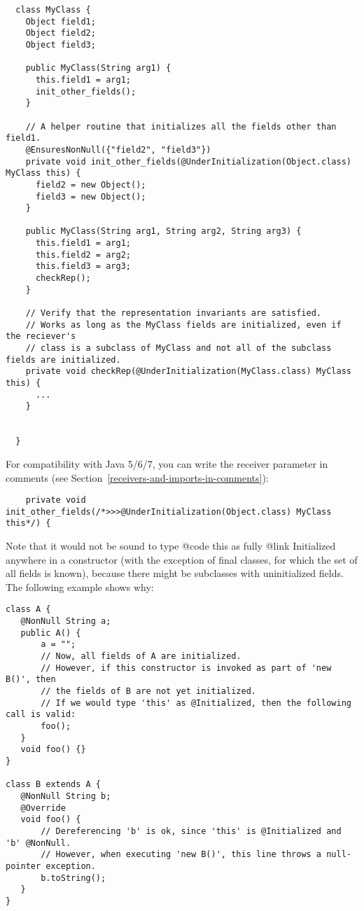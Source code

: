 \begin{Verbatim}
  class MyClass {
    Object field1;
    Object field2;
    Object field3;

    public MyClass(String arg1) {
      this.field1 = arg1;
      init_other_fields();
    }

    // A helper routine that initializes all the fields other than field1.
    @EnsuresNonNull({"field2", "field3"})
    private void init_other_fields(@UnderInitialization(Object.class) MyClass this) {
      field2 = new Object();
      field3 = new Object();
    }

    public MyClass(String arg1, String arg2, String arg3) {
      this.field1 = arg1;
      this.field2 = arg2;
      this.field3 = arg3;
      checkRep();
    }

    // Verify that the representation invariants are satisfied.
    // Works as long as the MyClass fields are initialized, even if the reciever's
    // class is a subclass of MyClass and not all of the subclass fields are initialized.
    private void checkRep(@UnderInitialization(MyClass.class) MyClass this) {
      ...
    }


  }
\end{Verbatim}

For compatibility with Java 5/6/7, you can write the receiver
parameter in comments (see Section~\ref{receivers-and-imports-in-comments}):
\begin{Verbatim}
    private void init_other_fields(/*>>>@UnderInitialization(Object.class) MyClass this*/) {
\end{Verbatim}


Note that it would not be sound to type {@code this} as fully {@link Initialized} anywhere in
a constructor (with the exception of final classes, for which the set
of all fields is known),
because there might be subclasses with uninitialized fields. The following example shows why:

\begin{Verbatim}
class A {
   @NonNull String a;
   public A() {
       a = "";
       // Now, all fields of A are initialized.
       // However, if this constructor is invoked as part of 'new B()', then
       // the fields of B are not yet initialized.
       // If we would type 'this' as @Initialized, then the following call is valid:
       foo();
   }
   void foo() {}
}

class B extends A {
   @NonNull String b;
   @Override
   void foo() {
       // Dereferencing 'b' is ok, since 'this' is @Initialized and 'b' @NonNull.
       // However, when executing 'new B()', this line throws a null-pointer exception.
       b.toString();
   }
}
\end{Verbatim}


